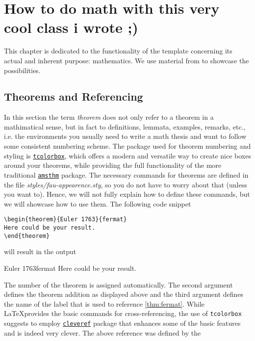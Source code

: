 \chapter{How to do math with this very cool class i wrote ;)}\label{ch:math}
This chapter is dedicated to the functionality of the template concerning its actual and 
inherent purpose: mathematics. We use material from \cite{FineProp2015} to showcase 
the possibilities.
\section{Theorems and Referencing}
In this section the term \textit{theorem} does not only refer to a theorem in a mathimatical 
sense, but in fact to definitions, lemmata, examples, remarks, etc., i.e. the environments 
you usually need to write a math thesis and want to follow some consistent numbering scheme. 
The package used for theorem numbering and styling is 
\href{https://www.ctan.org/pkg/tcolorbox}{\texttt{tcolorbox}}, which offers a modern and 
versatile way to create nice boxes around your theorems, while providing the full functionality 
of the more traditional \href{https://www.ctan.org/pkg/amsthm}{\texttt{amsthm}} package. 
The necessary commands for theorems are defined in the 
file \textit{styles/fau-appearence.sty}, so you do not have to worry about that (unless you want to). 
Hence, we will not fully explain how to define these commands, 
but we will showcase how to use them. The following code snippet
\begin{lstlisting}[language={[LaTeX]TeX}]
\begin{theorem}{Euler 1763}{fermat}
Here could be your result.
\end{theorem}
\end{lstlisting}
will result in the output
\begin{theorem}{Euler 1763}{fermat}
Here could be your result.
\end{theorem}
The number of the theorem is assigned automatically. The second argument defines the theorem 
addition as displayed above and the third argument defines the name of the label that is used 
to reference \cref{thm:fermat}. While \LaTeX provides the basic commands for cross-referencing, 
the use of \texttt{tcolorbox} suggests to employ 
\href{https://ctan.org/pkg/cleveref}{\texttt{cleveref}} package that enhances some 
of the basic features and is indeed very clever. The above reference was defined by the 
